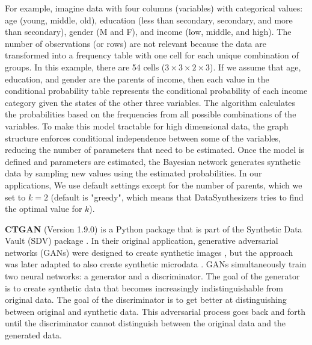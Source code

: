 \documentclass[runningheads]{llncs}
\begin{document}
For example, imagine data with four columns (variables) with categorical values: age (young, middle, old), education (less than secondary, secondary, and more than secondary), gender (M and F), and income (low, middle, and high).   The number of observations (or rows) are not relevant because the data are transformed into a frequency table with one cell for each unique combination of groups.  In this example, there are 54 cells  ($3 \times 3 \times 2\times 3$).  If we assume that age, education, and gender are the parents of income, then each value in the conditional probability table represents the conditional probability of each income category given the states of the other three variables. The algorithm calculates the probabilities based on the frequencies from all possible combinations of the variables.  To make this model tractable for high dimensional data, the graph structure enforces conditional independence between some of the variables, reducing the number of parameters that need to be estimated. Once the model is defined and parameters are estimated, the Bayesian network generates synthetic data by sampling  new values using the estimated probabilities.  In our applications, We use default settings except for the number of parents, which we set to $k=2$ (default is "greedy", which means that DataSynthesizers tries to find the optimal value for $k$). 

{\bf CTGAN} (Version 1.9.0) \cite{ctgan} is a Python package that is part of the Synthetic Data Vault (SDV) package \cite{patki2016synthetic}.  In their original application, generative adversarial networks (GANs) were designed to create synthetic images  \cite{goodfellow2014generative}, but the approach was later adapted to also create synthetic microdata \cite{park2018data}.  GANs simultaneously train two neural networks: a generator and a discriminator. The goal of the generator is to create synthetic data that becomes increasingly indistinguishable from original data.  The goal of the discriminator is to get better at distinguishing between original and synthetic data.  This adversarial process goes back and forth until the discriminator cannot distinguish between the original data and the generated data.  
\end{document}
